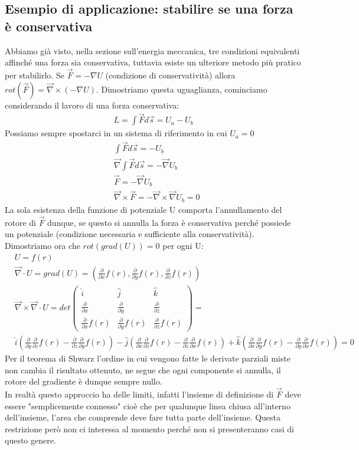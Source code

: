 \subsection{Esempio di applicazione: stabilire se una forza è conservativa}
Abbiamo già visto, nella sezione sull'energia meccanica, tre condizioni equivalenti affinché una forza sia conservativa, tuttavia esiste un ulteriore metodo più pratico per stabilirlo.  Se $\vec{F} = -\nabla U$ (condizione di conservatività) allora $rot(\vec{F}) = \vec{\nabla}\times (-\nabla U)$. Dimostriamo questa uguaglianza, cominciamo considerando il lavoro di una forza conservativa:
\begin{align*}
	L = \int\vec{F}d\vec{s} = U_a-U_b
\end{align*}
Possiamo sempre spostarci in un sistema di riferimento in cui $U_a = 0$
\begin{align*}
	&\int\vec{F}d\vec{s} = -U_b\\
	&\vec{\nabla}\int\vec{F}d\vec{s} = -\vec{\nabla}U_b\\
	&\vec{F} = -\vec{\nabla}U_b\\
	&\vec{\nabla}\times \vec{F} = -\vec{\nabla}\times\vec{\nabla}U_b= 0
\end{align*}
La sola esistenza della funzione di potenziale U comporta l'annullamento del rotore di $\vec{F}$ dunque, se questo si annulla la forza è conservativa perché possiede un potenziale (condizione necessaria e sufficiente alla conservatività).\\
Dimostriamo ora che $rot(grad(U))=0$ per ogni U:
\begin{align*}
&U = f(r)\\
&\vec{\nabla}\cdot U= grad(U) = (\frac{\partial}{\partial x}f(r),\frac{\partial}{\partial y}f(r), \frac{\partial}{\partial z}f(r) )\\
&\vec{\nabla}\times \vec{\nabla}\cdot U = det
\begin{pmatrix}
	\hat{i}& \hat{j}&\hat{k}\\
	\frac{\partial}{\partial x}&\frac{\partial}{\partial y}&\frac{\partial}{\partial z}\\
	\frac{\partial}{\partial x}f(r)&\frac{\partial}{\partial y}f(r)& \frac{\partial}{\partial z}f(r) 
\end{pmatrix}
=\\
&\hat{i}(\frac{\partial}{\partial y}\frac{\partial}{\partial z}f(r) -\frac{\partial}{\partial z}\frac{\partial}{\partial y}f(r))-\hat{j}(\frac{\partial}{\partial x} \frac{\partial}{\partial z}f(r) -\frac{\partial}{\partial z}\frac{\partial}{\partial x}f(r))+\hat{k}(\frac{\partial}{\partial x}\frac{\partial}{\partial y}f(r)-\frac{\partial}{\partial y}\frac{\partial}{\partial x}f(r)) = 0
\end{align*}
Per il teorema di Shwarz l'ordine in cui vengono fatte le derivate parziali miste non cambia il risultato ottenuto, ne segue che ogni componente si annulla, il rotore del gradiente è dunque sempre nullo.\\
In realtà questo approccio ha delle limiti, infatti l'insieme di definizione di $\vec{F}$  deve essere "semplicemente connesso" cioè che per qualunque linea chiusa all'interno dell'insieme, l'area che comprende deve fare tutta parte dell'insieme. Questa restrizione però non ci interessa al momento perché non si presenteranno casi di questo genere.

